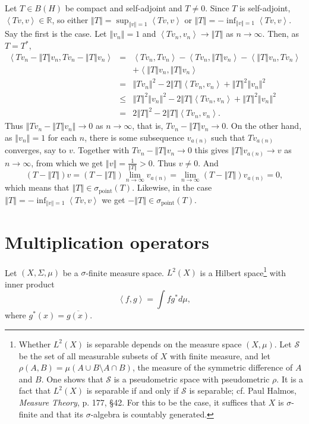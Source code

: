 \documentclass{article}
\newcommand{\inner}[2]{\left\langle #1, #2 \right\rangle}
\newcommand{\point}{\sigma_{\textrm{point}}}
\newcommand{\norm}[1]{\left\Vert #1 \right\Vert}
\begin{document}
Let $T \in B(H)$ be compact and self-adjoint and $T \neq 0$.
Since $T$ is self-adjoint, $\inner{Tv}{v} \in \mathbb{R}$, so either $\norm{T}=\sup_{\norm{v}=1} \inner{Tv}{v}$ or
$\norm{T}=-\inf_{\norm{v}=1} \inner{Tv}{v}$. Say the first is the case. Let $\norm{v_n}=1$ and $\inner{Tv_n}{v_n} \to \norm{T}$ as
$n \to \infty$. Then, as $T=T^*$,
\begin{eqnarray*}
\inner{Tv_n-\norm{T}v_n}{Tv_n-\norm{T}v_n}&=&\inner{Tv_n}{Tv_n}-\inner{Tv_n}{\norm{T}v_n}-\inner{\norm{T}v_n}{Tv_n}\\
&&+\inner{\norm{T}v_n}{\norm{T}v_n}\\
&=&\norm{Tv_n}^2-2\norm{T}\inner{Tv_n}{v_n}+\norm{T}^2 \norm{v_n}^2\\
&\leq&\norm{T}^2 \norm{v_n}^2-2\norm{T}\inner{Tv_n}{v_n}+\norm{T}^2 \norm{v_n}^2\\
&=&2\norm{T}^2-2\norm{T}\inner{Tv_n}{v_n}.
\end{eqnarray*}
Thus $\norm{Tv_n-\norm{T}v_n} \to 0$ as $n \to \infty$, that is, $Tv_n - \norm{T}v_n \to 0$. On the other hand, as $\norm{v_n}=1$ for each $n$, there is some subsequence
$v_{a(n)}$ such that $Tv_{a(n)}$ converges, say to $v$. Together with $Tv_n -\norm{T}v_n \to 0$ this gives
$\norm{T}v_{a(n)} \to v$ as $n \to \infty$, from which we get $\norm{v}=\frac{1}{\norm{T}}>0$. Thus $v \neq 0$. And
\[
(T-\norm{T})v=(T-\norm{T})\lim_{n \to \infty} v_{a(n)} = \lim_{n \to \infty} (T-\norm{T}) v_{a(n)} = 0,
\]
which means that $\norm{T} \in \point(T)$. Likewise, in the case $\norm{T}=-\inf_{\norm{v}=1} \inner{Tv}{v}$ we get
$-\norm{T} \in \point(T)$.

\section{Multiplication operators}
Let $(X,\Sigma,\mu)$ be a $\sigma$-finite measure space. $L^2(X)$ is a Hilbert space\footnote{Whether
 $L^2(X)$ is separable depends on the measure space $(X,\mu)$. Let $\mathscr{S}$ be the set of all measurable subsets
 of $X$ with finite measure, and let $\rho(A,B)=\mu(A \cup B \setminus A \cap B)$, the measure
 of the symmetric difference of $A$ and $B$. One shows that $\mathscr{S}$ is a pseudometric space with pseudometric $\rho$. It is a fact
 that $L^2(X)$ is separable if and only if $\mathscr{S}$ is separable; cf. Paul Halmos, {\em Measure Theory},
 p. 177, \S 42. For this to be the case, it suffices that $X$ is $\sigma$-finite and that its $\sigma$-algebra
 is countably generated.} with inner product
\[
\inner{f}{g}=\int f g^* d\mu,
\]
where $g^*(x)=\overline{g(x)}$.
\end{document}

